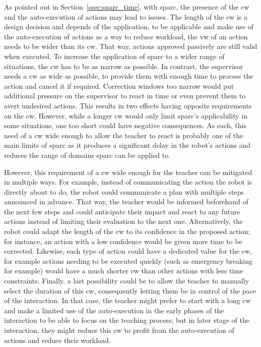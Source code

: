 As pointed out in Section~\ref{ssec:sparc_time}, with \gls{sparc}, the presence of the \gls{cw} and the auto-execution of actions may lead to issues. The length of the \gls{cw} is a design decision and depends of the application, to be applicable and make use of the auto-execution of actions as a way to reduce workload, the \gls{vw} of an action needs to be wider than its \gls{cw}. That way, actions approved passively are still valid when executed. To increase the application of \gls{sparc} to a wider range of situations, the \gls{cw} has to be as narrow as possible. In contrast, the supervisor needs a \gls{cw} as wide as possible, to provide them with enough time to process the action and cancel it if required. Correction windows too narrow would put additional pressure on the supervisor to react in time or even prevent them to avert undesired actions. 
This results in two effects having opposite requirements on the \gls{cw}. However, while a longer \gls{cw} would only limit \gls{sparc}'s applicability in some situations, one too short could have negative consequences. As such, this need of a \gls{cw} wide enough to allow the teacher to react is probably one of the main limits of \gls{sparc} as it produces a significant delay in the robot's actions and reduces the range of domains \gls{sparc} can be applied to.

However, this requirement of a \gls{cw} wide enough for the teacher can be mitigated in multiple ways. For example, instead of communicating the action the robot is directly about to do, the robot could communicate a plan with multiple steps announced in advance. That way, the teacher would be informed beforehand of the next few steps and could anticipate their impact and react to any future actions instead of limiting their evaluation to the next one. Alternatively, the robot could adapt the length of the \gls{cw} to its confidence in the proposed action; for instance, an action with a low confidence would be given more time to be corrected. Likewise, each type of action could have a dedicated value for the \gls{cw}, for example actions needing to be executed quickly (such as emergency breaking for example) would have a much shorter \gls{cw} than other actions with less time constraints. Finally, a last possibility could be to allow the teacher to manually select the duration of this \gls{cw}, consequently letting them be in control of the pace of the interaction. In that case, the teacher might prefer to start with a long \gls{cw} and make a limited use of the auto-execution in the early phases of the interaction to be able to focus on the teaching process; but in later stage of the interaction, they might reduce this \gls{cw} to profit from the auto-execution of actions and reduce their workload.

